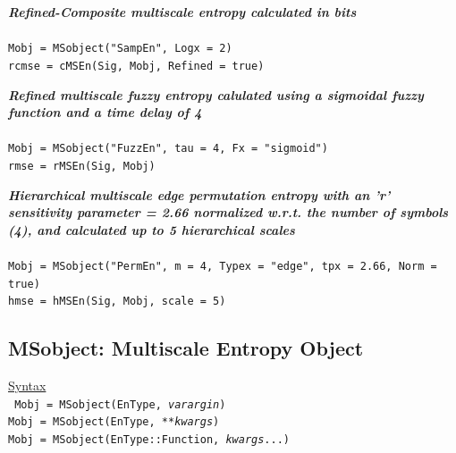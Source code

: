 \documentclass[12pt, a4paper, titlepage, openany]{book}
\begin{document}
\noindent \emph{\textbf{Refined-Composite multiscale entropy calculated in bits}} \cite{cMS2}
\\ \ \\ \indent \texttt{Mobj = MSobject("SampEn", Logx = 2)\\
\indent rcmse = cMSEn(Sig, Mobj, Refined = true)}

\noindent \emph{\textbf{Refined multiscale fuzzy entropy calulated using a sigmoidal fuzzy function and a time delay of 4}}
\\ \ \\ \indent \texttt{Mobj = MSobject("FuzzEn", tau = 4, Fx = "sigmoid")\\
\indent rmse = rMSEn(Sig, Mobj)}

\noindent \emph{\textbf{Hierarchical multiscale edge permutation entropy with an 'r' sensitivity parameter = 2.66 normalized w.r.t. the number of symbols (4), and calculated up to 5 hierarchical scales}}
\\ \ \\ \indent \texttt{Mobj = MSobject("PermEn", m = 4, Typex = "edge", tpx = 2.66, Norm = true)\\
\indent hmse = hMSEn(Sig, Mobj, scale = 5)}
\normalsize



\newpage
\subsection{\normalsize MSobject: \hspace{15mm} Multiscale Entropy Object} \label{Mobjx}
\noindent\ul{Syntax} \vspace{6mm} \\ \noindent \texttt{\footnotesize
Mobj = MSobject(EnType, \textit{varargin})\\
Mobj = MSobject(EnType, \textit{**kwargs})\\ 
Mobj = MSobject(EnType::Function, \textit{kwargs}...)}
\end{document}
